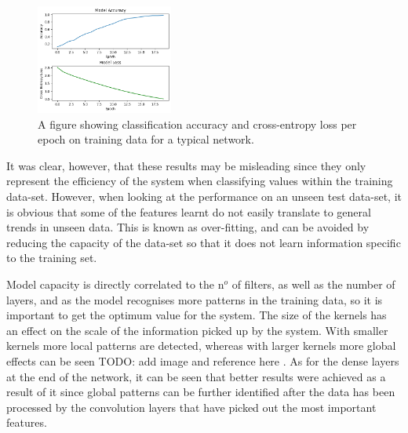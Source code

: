 \begin{figure}[htb]
    \centering
    \includegraphics[width=0.4\textwidth]{implementation/images/accuracy_and_loss_per_epoch.png}
    \caption{A figure showing classification accuracy and cross-entropy loss per epoch on training data for a typical network.}
    \label{fig:accuracy_and_loss_per_epoch}
\end{figure}

It was clear, however, that these results may be misleading since they only represent the efficiency of the system when classifying values within the training data-set. However, when looking at the performance on an unseen test data-set, it is obvious that some of the features learnt do not easily translate to general trends in unseen data. This is known as over-fitting, and can be avoided by reducing the capacity of the data-set so that it does not learn information specific to the training set.

Model capacity is directly correlated to the n$ ^o $ of filters, as well as the number of layers, and as the model recognises more patterns in the training data, so it is important to get the optimum value for the system. The size of the kernels has an effect on the scale of the information picked up by the system. With smaller kernels more local patterns are detected, whereas with larger kernels more global effects can be seen \color{red} TODO: add image and reference here \color{black}. As for the dense layers at the end of the network, it can be seen that better results were achieved as a result of it since global patterns can be further identified after the data has been processed by the convolution layers that have picked out the most important features.

